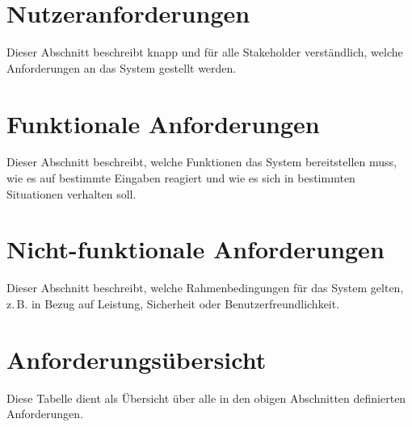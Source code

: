
\section{Nutzeranforderungen}
\label{appsec:nutzer-anforderungen}

Dieser Abschnitt beschreibt knapp und für alle Stakeholder verständlich, welche
Anforderungen an das System gestellt werden.



\section{Funktionale Anforderungen}
\label{appsec:funktionale-anforderungen}

Dieser Abschnitt beschreibt, welche Funktionen das System bereitstellen muss, wie es auf
bestimmte Eingaben reagiert und wie es sich in bestimmten Situationen verhalten soll.



\section{Nicht-funktionale Anforderungen}
\label{appsec:nicht-funktionale-anforderungen}

Dieser Abschnitt beschreibt, welche Rahmenbedingungen für das System gelten, z.\,B. in
Bezug auf Leistung, Sicherheit oder Benutzerfreundlichkeit.



\section{Anforderungsübersicht}
\label{appsec:anforderungsuebersicht}

Diese Tabelle dient als Übersicht über alle in den obigen Abschnitten definierten
Anforderungen.


